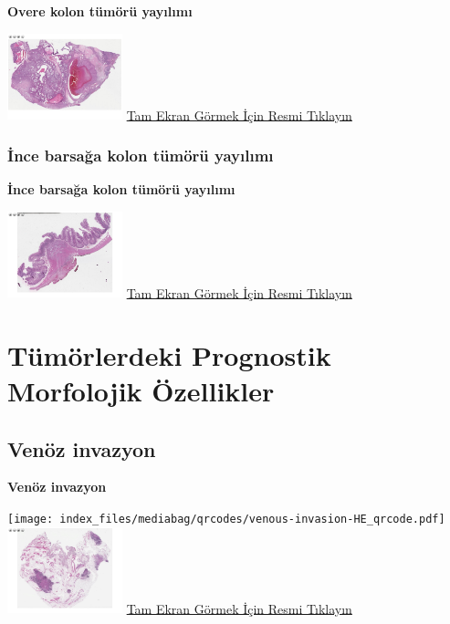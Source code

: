 \documentclass[
  letterpaper,
  DIV=11,
  numbers=noendperiod]{scrreprt}
\begin{document}
\textbf{Overe kolon tümörü yayılımı}

\href{https://images.patolojiatlasi.com/tumor-spread/HE-over.html}{\includegraphics[width=0.25\textwidth,height=\textheight]{./screenshots/thumbnail_tumor-spread-over.png}}
\href{https://images.patolojiatlasi.com/tumor-spread/HE-over.html}{Tam
Ekran Görmek İçin Resmi Tıklayın}

\hypertarget{sec-ince-barsak-kolon-tumor-yayilimi}{%
\section{İnce barsağa kolon tümörü
yayılımı}\label{sec-ince-barsak-kolon-tumor-yayilimi}}

\textbf{İnce barsağa kolon tümörü yayılımı}

\href{https://images.patolojiatlasi.com/tumor-spread/HE-small-intestine.html}{\includegraphics[width=0.25\textwidth,height=\textheight]{./screenshots/thumbnail_tumor-spread-small-intestine.png}}
\href{https://images.patolojiatlasi.com/tumor-spread/HE-small-intestine.html}{Tam
Ekran Görmek İçin Resmi Tıklayın}

\part{Tümörlerdeki Prognostik Morfolojik Özellikler}

\hypertarget{sec-venoz-invazyon}{%
\chapter{Venöz invazyon}\label{sec-venoz-invazyon}}

\textbf{Venöz invazyon}

\texttt{[image: index\_files/mediabag/qrcodes/venous-invasion-HE\_qrcode.pdf]}
\href{https://images.patolojiatlasi.com/venous-invasion/HE.html}{\includegraphics[width=0.25\textwidth,height=\textheight]{./screenshots/thumbnail_venous-invasion.png}}
\href{https://images.patolojiatlasi.com/venous-invasion/HE.html}{Tam
Ekran Görmek İçin Resmi Tıklayın}
\end{document}
